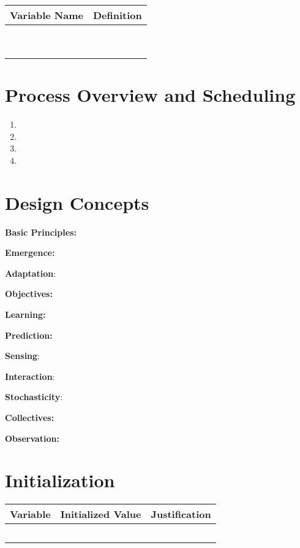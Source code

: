 \documentclass[
]{book}
\providecommand{\tightlist}{%
  \setlength{\itemsep}{0pt}\setlength{\parskip}{0pt}}
\begin{document}
\begin{longtable}[]{@{}ll@{}}
\toprule\noalign{}
Variable Name & Definition \\
\midrule\noalign{}
\endhead
\bottomrule\noalign{}
\endlastfoot
& \\
& \\
& \\
& \\
& \\
& \\
& \\
& \\
& \\
\end{longtable}

\section{Process Overview and Scheduling}\label{process-overview-and-scheduling-4}

\begin{enumerate}
\def\labelenumi{\arabic{enumi}.}
\tightlist
\item
\item
\item
\item
\end{enumerate}

\section{Design Concepts}\label{design-concepts-4}

\textbf{Basic Principles:}

\textbf{Emergence:}

\textbf{Adaptation}:

\textbf{Objectives:}

\textbf{Learning:}

\textbf{Prediction:}

\textbf{Sensing}:

\textbf{Interaction}:

\textbf{Stochasticity}:

\textbf{Collectives:}

\textbf{Observation:}

\section{Initialization}\label{initialization-4}

\begin{longtable}[]{@{}ccc@{}}
\toprule\noalign{}
Variable & Initialized Value & Justification \\
\midrule\noalign{}
\endhead
\bottomrule\noalign{}
\endlastfoot
& & \\
& & \\
& & \\
& & \\
& & \\
\end{longtable}
\end{document}

